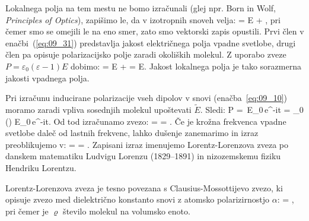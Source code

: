 Lokalnega polja na tem mestu ne bomo izračunali (glej npr. Born in Wolf, {\it
Principles of Optics}), zapišimo le, da v izotropnih snoveh velja:
\beq
{} = E + ,
\label{eq:09_31}
\eeq
pri čemer smo se omejili le na eno smer, zato smo vektorski zapis opustili. 
Prvi člen v enačbi~(\ref{eq:09_31}) predstavlja jakost električnega 
polja vpadne svetlobe, drugi člen pa opisuje polarizacijsko 
polje zaradi okoliških molekul. Z uporabo zveze
$P = \varepsilon_0 (\varepsilon -1) E$ dobimo:
\beq
{} = E +  = 
E.
\label{eq:09_32}
\eeq
Jakost lokalnega polja je tako sorazmerna jakosti vpadnega polja. 

Pri izračunu inducirane polarizacije vseh dipolov v snovi (enačba~\ref{eq:09_10}) 
moramo zaradi vpliva sosednjih molekul upoštevati $\tilde{E}$. Sledi:
\beq
P = 
\,E_0\,e^{-i\omega t}
= \varepsilon_0 () E_0\,e^{-i\omega t}.
\label{eq:09_33}
\eeq
Od tod izračunamo zvezo:
\beq
{} =  = 
.
\label{eq:09_34}
\eeq
Če je krožna frekvenca vpadne svetlobe daleč od lastnih frekvenc, lahko dušenje zanemarimo in 
izraz preoblikujemo v:
\beq
{} =  = 
.
\label{eq:09_35}
\eeq
Zapisani izraz imenujemo Lorentz-Lorenzova zveza po danskem matematiku Ludvigu Lorenzu 
(1829--1891) in nizozemskemu fiziku Hendriku Lorentzu. 
\begin{remark}
 Lorentz-Lorenzova zveza je tesno povezana s Clausius-Mossottijevo zvezo, ki opisuje
 zvezo med dielektrično konstanto snovi z atomsko polarizirnostjo $\alpha$:
 \beq
{} = ,
\label{eq:09_35a}
\eeq
pri čemer je $\varrho$ število molekul na volumsko enoto. 
\end{remark}

